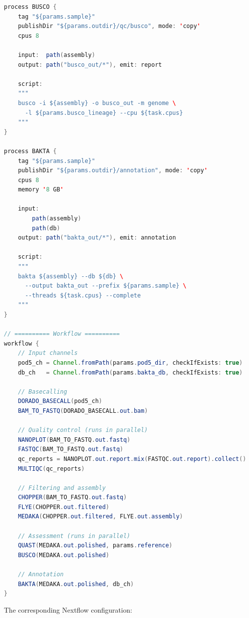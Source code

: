 \begin{lstlisting}[language=Java,caption={Complete end-to-end Nextflow pipeline for nanopore analysis (main.nf).},label=lst:diy-nf-e2e]
process BUSCO {
    tag "${params.sample}"
    publishDir "${params.outdir}/qc/busco", mode: 'copy'
    cpus 8

    input:  path(assembly)
    output: path("busco_out/*"), emit: report

    script:
    """
    busco -i ${assembly} -o busco_out -m genome \
      -l ${params.busco_lineage} --cpu ${task.cpus}
    """
}

process BAKTA {
    tag "${params.sample}"
    publishDir "${params.outdir}/annotation", mode: 'copy'
    cpus 8
    memory '8 GB'

    input:
        path(assembly)
        path(db)
    output: path("bakta_out/*"), emit: annotation

    script:
    """
    bakta ${assembly} --db ${db} \
      --output bakta_out --prefix ${params.sample} \
      --threads ${task.cpus} --complete
    """
}

// ========== Workflow ==========
workflow {
    // Input channels
    pod5_ch = Channel.fromPath(params.pod5_dir, checkIfExists: true)
    db_ch   = Channel.fromPath(params.bakta_db, checkIfExists: true)

    // Basecalling
    DORADO_BASECALL(pod5_ch)
    BAM_TO_FASTQ(DORADO_BASECALL.out.bam)

    // Quality control (runs in parallel)
    NANOPLOT(BAM_TO_FASTQ.out.fastq)
    FASTQC(BAM_TO_FASTQ.out.fastq)
    qc_reports = NANOPLOT.out.report.mix(FASTQC.out.report).collect()
    MULTIQC(qc_reports)

    // Filtering and assembly
    CHOPPER(BAM_TO_FASTQ.out.fastq)
    FLYE(CHOPPER.out.filtered)
    MEDAKA(CHOPPER.out.filtered, FLYE.out.assembly)

    // Assessment (runs in parallel)
    QUAST(MEDAKA.out.polished, params.reference)
    BUSCO(MEDAKA.out.polished)

    // Annotation
    BAKTA(MEDAKA.out.polished, db_ch)
}
\end{lstlisting}

The corresponding Nextflow configuration:

